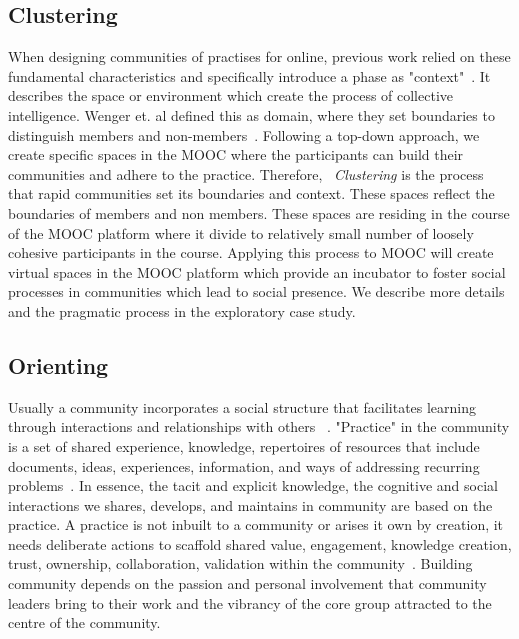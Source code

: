 \documentclass[manuscript,screen,review]{acmart}
\begin{document}
\subsection{Clustering} 
When designing communities of practises for online, previous work relied  on these fundamental characteristics and specifically introduce a phase as "context"~\cite{gunawardena2009theoretical}. It describes the space or environment which create the process of collective intelligence. Wenger et. al defined this as domain, where they set boundaries to distinguish members and non-members~\cite{wenger2010communities}. Following a top-down approach, we create specific spaces in the MOOC where the participants can build their communities and adhere to the practice. Therefore, ~\textit{Clustering} is the process that rapid communities set its boundaries and context. These spaces reflect the boundaries of members and non members. These spaces are residing in the course of the MOOC platform where it divide to relatively small number of loosely cohesive participants in the course.  Applying this process to MOOC will create virtual spaces in the MOOC platform which provide an incubator to foster social processes in communities which lead to social presence. We describe more details and the pragmatic process in the exploratory case study. 

\subsection{Orienting} 
Usually a community incorporates a social structure that facilitates learning through interactions and relationships with others ~\cite{wenger2001harvard}. "Practice" in the community is a set of shared experience, knowledge, repertoires of resources that include documents, ideas, experiences, information, and ways of addressing recurring problems~\cite{wenger2001harvard}. In essence, the tacit and explicit knowledge, the cognitive and social interactions we shares, develops, and maintains in community are based on the practice. A practice is not inbuilt to a community or arises it own by creation, it needs deliberate actions to scaffold shared value, engagement, knowledge creation, trust, ownership, collaboration, validation within the community~\cite{liu2009community}. Building community depends on the passion and personal involvement that community leaders bring to their work and the vibrancy of the core group attracted to the centre of the community. 
\end{document}
